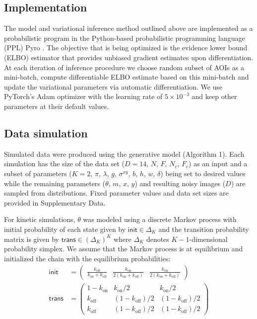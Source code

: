 

\subsection*{Implementation}

The model and variational inference method outlined above are implemented as a probabilistic program in the Python-based probabilistic programming language (PPL) Pyro \cite{Foerster2018-kd,Bingham2019-qy,Obermeyer2019-xt}. The objective that is being optimized is the evidence lower bound (ELBO) estimator that provides unbiased gradient estimates upon differentiation. At each iteration of inference procedure we choose random subset of AOIs as a mini-batch, compute differentiable ELBO estimate based on this mini-batch and update the variational parameters via automatic differentiation. We use PyTorch's Adam optimizer with the learning rate of $5\times 10^{-3}$ and keep other parameters at their default values. 

\subsection*{Data simulation}

Simulated data were produced using the generative model (Algorithm 1). Each simulation has the size of the data set ($D=14$, $N$, $F$, $N_c$, $F_c$) as an input and a subset of parameters ($K=2$, $\pi$, $\lambda$, $g$, $\sigma^{xy}$, $b$, $h$, $w$, $\delta$) being set to desired values while  the remaining parameters ($\theta$, $m$, $x$, $y$) and resulting noisy images ($D$) are sampled from distributions. Fixed parameter values and data set sizes are provided in Supplementary Data.

For kinetic simulations, $\theta$ was modeled using a discrete Markov process with initial probability of each state given by $\mathsf{init} \in \Delta_K$ and the transition probability matrix is given by $\mathsf{trans} \in (\Delta_K)^K$ where $\Delta_K$ denotes $K-1$-dimensional probability simplex. We assume that the Markov process is at equilibrium and initialized the chain with the equilibrium probabilities:
%
\begin{subequations}
\begin{align}
    \mathsf{init} &= \begin{pmatrix} \frac{k_\mathrm{off}}{k_\mathrm{on} + k_\mathrm{off}} & \frac{k_\mathrm{on}}{2\left( k_\mathrm{on} + k_\mathrm{off} \right)} & \frac{k_\mathrm{on}}{2\left( k_\mathrm{on} + k_\mathrm{off} \right)} \end{pmatrix} \\
    \mathsf{trans} &= \begin{pmatrix} 1 - k_\mathrm{on} & k_\mathrm{on}/2 & k_\mathrm{on}/2 \\ k_\mathrm{off} & (1 - k_\mathrm{off})/2 & (1 - k_\mathrm{off})/2 \\ k_\mathrm{off} & (1 - k_\mathrm{off})/2 & (1 - k_\mathrm{off})/2 \end{pmatrix}
\end{align}
\end{subequations}

